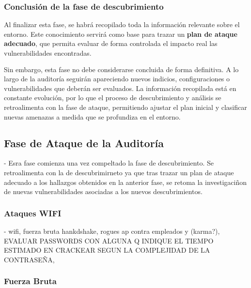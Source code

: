 \documentclass[a4paper, 11pt]{article}
\begin{document}
\par\vspace{0.5cm}




\subsubsection*{Conclusión de la fase de descubrimiento}

Al finalizar esta fase, se habrá recopilado toda la información relevante sobre el entorno. 
Este conocimiento servirá como base para trazar un \textbf{plan de ataque adecuado}, que 
permita evaluar de forma controlada el impacto real las vulnerabilidades encontradas.
\vspace{0.5cm}

Sin embargo, esta fase no debe considerarse concluida de forma definitiva. A lo largo de la auditoría seguirán apareciendo nuevos indicios, configuraciones o vulnerabilidades que deberán ser evaluados. La información recopilada está en constante evolución, por lo que el proceso de descubrimiento y análisis se retroalimenta con la fase de ataque, permitiendo ajustar el plan inicial y clasificar nuevas amenazas a medida que se profundiza en el entorno.

\clearpage




\subsection{Fase de Ataque de la Auditoría}
\par\vspace{0.5cm}



-   Esra fase comienza una vez compeltado la fase de descubrimiento. Se retroalimenta con la de descubrimirneto ya que tras trazar un plan de ataque adecuado a los hallazgos obtenidos en la anterior fase, se retoma la investigaciñon de nuevas vulnerabilidades asociadas a los nuevos descubrimientos.

\subsubsection{Ataques WIFI}

- wifi, fuerza bruta hankdshake, rogues ap contra empleados y (karma?), EVALUAR PASSWORDS CON ALGUNA Q INDIQUE EL TIEMPO ESTIMADO EN CRACKEAR SEGUN 
  LA COMPLEJIDAD DE LA CONTRASEÑA,


\subsubsection{Fuerza Bruta}
\end{document}
